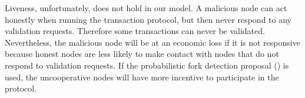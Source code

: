 Liveness, unfortunately, does not hold in our model.
A malicious node can act honestly when running the transaction protocol,
but then never respond to any validation requests.
Therefore some transactions can never be validated.
Nevertheless, the malicious node will be at an economic loss if it is not responsive because honest nodes are less likely to make contact with nodes that do not respond to validation requests.
If the probabilistic fork detection proposal () is used,
the uncooperative nodes will have more incentive to participate in the protocol.


% 

